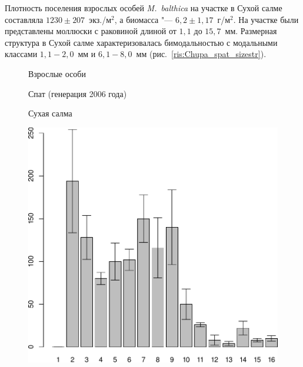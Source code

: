 Плотность поселения взрослых особей {\it M.~balthica} на участке в Сухой салме составляла $1230 \pm 207$~экз./м$^2$, а биомасса "--- $6,2 \pm 1,17$~г/м$^2$. 
На участке были представлены моллюски с раковиной длиной от $1,1$ до $15,7$~мм. 
Размерная структура в Сухой салме характеризовалась бимодальностью с модальными классами $1,1 - 2,0$~мм и $6,1 - 8,0$~мм (рис.~\ref{ris:Chupa_spat_sizestr}). 
	\begin{figure}[p]
	\begin{minipage}[b]{.46\linewidth}
	\begin{center}
	Взрослые особи
	\end{center}
	\end{minipage}
	\hfil %
	\begin{minipage}[b]{.46\linewidth}
	\begin{center}
	Спат (генерация 2006 года)
	\end{center}
	\end{minipage}
%
	\begin{minipage}[b]{\linewidth}
	\begin{center}
		Сухая салма
	\end{center}
	\end{minipage}
%
	\begin{minipage}[b]{.46\linewidth}
	\begin{center}
		\includegraphics[width=0.21\textheight]{../White_Sea/spat/adult_str_Suhaya_1.pdf}

\end{center}
\end{minipage}
\end{figure}
